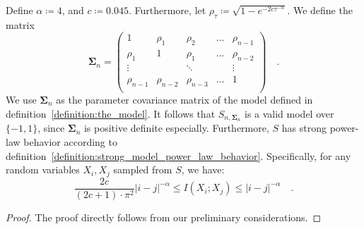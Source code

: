 \documentclass[../../main.tex]{subfiles}
\begin{document}
\begin{theorem}
    Define $\alpha \coloneqq 4$, and $c \coloneqq 0.045$. Furthermore, let $\rho_\tau \coloneqq \sqrt{1 - e^{-2c \tau^{-\alpha}}}$. We define the matrix
    \[
        \bm{\Sigma}_n = \begin{pmatrix*}
        1& \rho_1& \rho_2& \dots & \rho_{n-1} \\
        \rho_1& 1& \rho_1& \dots & \rho_{n-2} \\
        \vdots &  & \ddots & & \vdots \\
        \rho_{n-1} & \rho_{n-2} & \rho_{n-3} & \dots & 1 \\
    \end{pmatrix*} \quad .
    \]
    We use $\bm{\Sigma}_n$ as the parameter covariance matrix of the model defined in definition~\ref{definition:the_model}. It follows that $S_{n, \bm{\Sigma}_n}$ is a valid model over $\{-1, 1\}$, since $\bm{\Sigma}_n$ is positive definite especially. Furthermore, $S$ has strong power-law behavior according to definition~\ref{definition:strong_model_power_law_behavior}. Specifically, for any random variables $X_i, X_j$ sampled from $S$, we have:
    \[
        \frac{2c}{(2c + 1) \cdot \pi^2} |i-j|^{-\alpha} \leq I(X_i; X_j) \leq |i-j|^{-\alpha} \quad .
    \]
\end{theorem}
\begin{proof}
    The proof directly follows from our preliminary considerations.
\end{proof}
\end{document}
